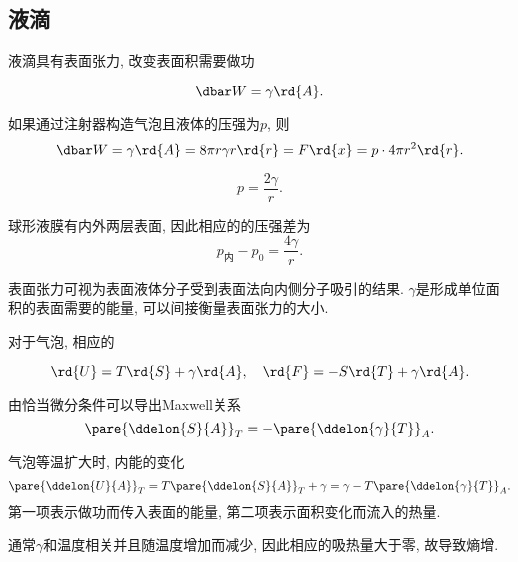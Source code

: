 \documentclass[../Thermal.tex]{subfiles}
\begin{document}
\subsection{液滴}
液滴具有表面张力, 改变表面积需要做功
\begin{finale}
\[ \dbar W = \gamma \rd{A}. \]
\end{finale}
如果通过注射器构造气泡且液体的压强为$p$, 则
\[ \dbar W = \gamma \rd{A} = 8\pi r\gamma r\rd{r} = F\rd{x} = p\cdot 4\pi r^2\rd{r}. \]
\begin{finale}
\[ p = \frac{2\gamma}{r}. \]
\end{finale}
\begin{ex}
球形液膜有内外两层表面, 因此相应的的压强差为
\[ p_{\text{内}} - p_0 = \frac{4\gamma}{r}. \]
\end{ex}
\begin{remark}
表面张力可视为表面液体分子受到表面法向内侧分子吸引的结果. $\gamma$是形成单位面积的表面需要的能量, 可以间接衡量表面张力的大小.
\end{remark}
对于气泡, 相应的
\begin{finale}
\[ \rd{U} = T\rd{S} + \gamma \rd{A},\quad \rd{F} = -S\rd{T} + \gamma\rd{A}. \]
\end{finale}
由恰当微分条件可以导出Maxwell关系
\[ \pare{\ddelon{S}{A}}_T = -\pare{\ddelon{\gamma}{T}}_A. \]
\begin{ex}
气泡等温扩大时, 内能的变化
\[ \pare{\ddelon{U}{A}}_T = T\pare{\ddelon{S}{A}}_T + \gamma = \gamma - T\pare{\ddelon{\gamma}{T}}_A. \]
第一项表示做功而传入表面的能量, 第二项表示面积变化而流入的热量.
\end{ex}
通常$\gamma$和温度相关并且随温度增加而减少, 因此相应的吸热量大于零, 故导致熵增.
\end{document}
